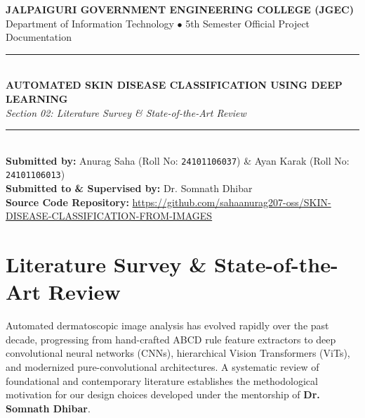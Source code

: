 \documentclass[12pt,a4paper]{article}
\begin{document}
\begin{center}
    {\Large \textbf{\color{primary} JALPAIGURI GOVERNMENT ENGINEERING COLLEGE (JGEC)}}\\[0.3em]
    {\normalsize Department of Information Technology $\bullet$ 5th Semester Official Project Documentation}\\[1em]
    \rule{\linewidth}{1.5pt}\\[0.5em]
    {\LARGE \textbf{AUTOMATED SKIN DISEASE CLASSIFICATION USING DEEP LEARNING}}\\[0.3em]
    {\large \textit{Section 02: Literature Survey \& State-of-the-Art Review}}\\[0.3em]
    \rule{\linewidth}{1.5pt}\\[0.8em]
    \textbf{Submitted by:} Anurag Saha (Roll No: \texttt{24101106037}) \& Ayan Karak (Roll No: \texttt{24101106013})\\[0.3em]
    \textbf{Submitted to \& Supervised by:} Dr. Somnath Dhibar\\[0.3em]
    \textbf{Source Code Repository:} \url{https://github.com/sahaanurag207-oss/SKIN-DISEASE-CLASSIFICATION-FROM-IMAGES}
\end{center}

\vspace{0.8em}

\section{Literature Survey \& State-of-the-Art Review}
Automated dermatoscopic image analysis has evolved rapidly over the past decade, progressing from hand-crafted ABCD rule feature extractors to deep convolutional neural networks (CNNs), hierarchical Vision Transformers (ViTs), and modernized pure-convolutional architectures. A systematic review of foundational and contemporary literature establishes the methodological motivation for our design choices developed under the mentorship of \textbf{Dr. Somnath Dhibar}.
\end{document}
